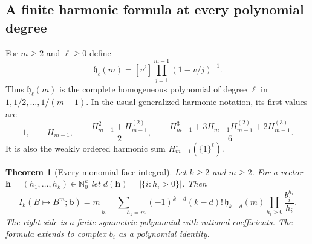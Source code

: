 \documentclass[11pt,letterpaper]{article}
\numberwithin{equation}{section}
\newtheorem{theorem}{Theorem}[section]
\theoremstyle{definition}
\theoremstyle{remark}
\newcommand{\N}{\mathbb N}
\begin{document}
\subsection{A finite harmonic formula at every polynomial degree}

For $m\ge2$ and $\ell\ge0$ define
\begin{equation}\label{sfj:eq:complete-harmonic}
 \mathfrak h_\ell(m)
  =[v^\ell]\prod_{j=1}^{m-1}(1-v/j)^{-1}.
\end{equation}
Thus $\mathfrak h_\ell(m)$ is the complete homogeneous polynomial
of degree $\ell$ in $1,1/2,\ldots,1/(m-1)$.  In the usual generalized
harmonic notation, its first values are
\[
 1,\qquad H_{m-1},\qquad
 \frac{H_{m-1}^2+H_{m-1}^{(2)}}2,\qquad
 \frac{H_{m-1}^3+3H_{m-1}H_{m-1}^{(2)}+2H_{m-1}^{(3)}}6.
\]
It is also the weakly ordered harmonic sum
$H_{m-1}^{\star}(\{1\}^{\ell})$.

\begin{theorem}[Every monomial face integral]
\label{sfj:thm:monomial}
Let $k\ge2$ and $m\ge2$.  For a vector
$\boldsymbol h=(h_1,\ldots,h_k)\in\N_0^k$ let
$d(\boldsymbol h)=|\{i:h_i>0\}|$.  Then
\begin{equation}\label{sfj:eq:monomial}
 \boxed{\displaystyle
 I_k(B\mapsto B^m;\boldsymbol b)
  =m\!\sum_{h_1+\cdots+h_k=m}
   (-1)^{k-d}(k-d)!\,\mathfrak h_{k-d}(m)
                  \prod_{h_i>0}\frac{b_i^{h_i}}{h_i}.}
\end{equation}
The right side is a finite symmetric polynomial with rational
coefficients.  The formula extends to complex $b_i$ as a polynomial
identity.
\end{theorem}
\end{document}
